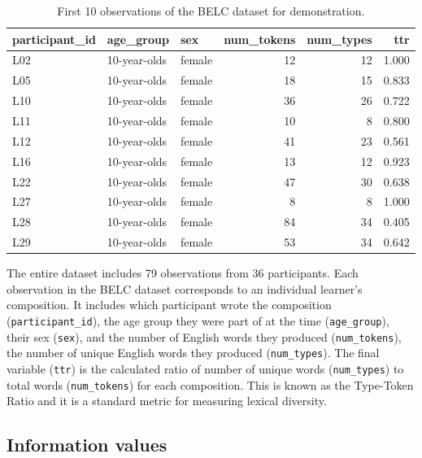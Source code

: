 \documentclass[
  letterpaper,
]{latex/krantz}
\begin{document}
\hypertarget{tbl-belc-overview}{}
\begin{table}
\caption{\label{tbl-belc-overview}First 10 observations of the BELC dataset for demonstration. }\tabularnewline

\centering
\begin{tabular}{l|l|l|r|r|r}
\hline
participant\_id & age\_group & sex & num\_tokens & num\_types & ttr\\
\hline
L02 & 10-year-olds & female & 12 & 12 & 1.000\\
\hline
L05 & 10-year-olds & female & 18 & 15 & 0.833\\
\hline
L10 & 10-year-olds & female & 36 & 26 & 0.722\\
\hline
L11 & 10-year-olds & female & 10 & 8 & 0.800\\
\hline
L12 & 10-year-olds & female & 41 & 23 & 0.561\\
\hline
L16 & 10-year-olds & female & 13 & 12 & 0.923\\
\hline
L22 & 10-year-olds & female & 47 & 30 & 0.638\\
\hline
L27 & 10-year-olds & female & 8 & 8 & 1.000\\
\hline
L28 & 10-year-olds & female & 84 & 34 & 0.405\\
\hline
L29 & 10-year-olds & female & 53 & 34 & 0.642\\
\hline
\end{tabular}
\end{table}

The entire dataset includes 79 observations from 36 participants. Each
observation in the BELC dataset corresponds to an individual learner's
composition. It includes which participant wrote the composition
(\texttt{participant\_id}), the age group they were part of at the time
(\texttt{age\_group}), their sex (\texttt{sex}), and the number of
English words they produced (\texttt{num\_tokens}), the number of unique
English words they produced (\texttt{num\_types}). The final variable
(\texttt{ttr}) is the calculated ratio of number of unique words
(\texttt{num\_types}) to total words (\texttt{num\_tokens}) for each
composition. This is known as the Type-Token Ratio and it is a standard
metric for measuring lexical diversity.

\hypertarget{information-values}{%
\subsection{Information values}\label{information-values}}
\end{document}
